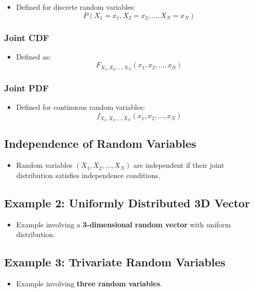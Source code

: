 \documentclass[12pt]{article}
\begin{document}
\begin{itemize}
    \item Defined for discrete random variables:
    \[
    P(X_1 = x_1, X_2 = x_2, \dots, X_N = x_N)
    \]
\end{itemize}

\subsubsection{Joint CDF}

\begin{itemize}
    \item Defined as:
    \[
    F_{X_1, X_2, \dots, X_N}(x_1, x_2, \dots, x_N)
    \]
\end{itemize}

\subsubsection{Joint PDF}

\begin{itemize}
    \item Defined for continuous random variables:
    \[
    f_{X_1, X_2, \dots, X_N}(x_1, x_2, \dots, x_N)
    \]
\end{itemize}

\subsection{Independence of Random Variables}

\begin{itemize}
    \item Random variables $(X_1, X_2, \dots, X_N)$ are independent if their joint distribution satisfies independence conditions.
\end{itemize}

\subsection{Example 2: Uniformly Distributed 3D Vector}

\begin{itemize}
    \item Example involving a \textbf{3-dimensional random vector} with uniform distribution.
\end{itemize}

\subsection{Example 3: Trivariate Random Variables}

\begin{itemize}
    \item Example involving \textbf{three random variables}.
\end{itemize}
\end{document}
